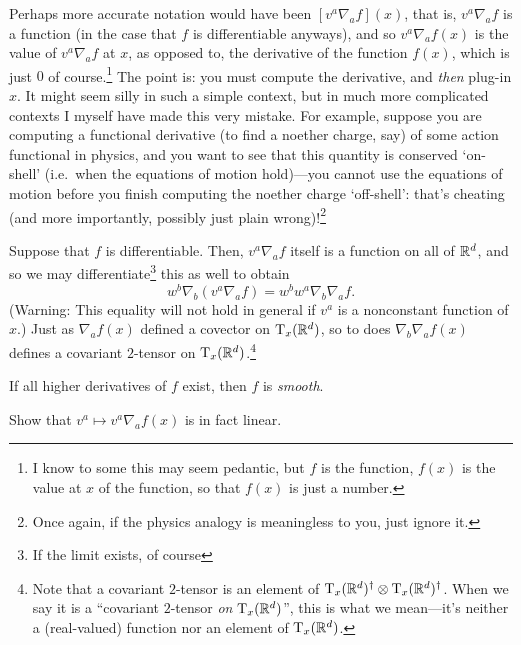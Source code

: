 \begin{dfn}
\begin{savenotes}
\begin{rmk}
\end{rmk}
\begin{rmk}
Perhaps more accurate notation would have been $[v^a\nabla _af](x)$, that is, $v^a\nabla _af$ is a function (in the case that $f$ is differentiable anyways), and so $v^a\nabla _af(x)$ is the value of $v^a\nabla _af$ at $x$, as opposed to, the derivative of the function $f(x)$, which is just $0$ of course.\footnote{I know to some this may seem pedantic, but $f$ is the function, $f(x)$ is the value at $x$ of the function, so that $f(x)$ is just a number.}  The point is:  you must compute the derivative, and \emph{then} plug-in $x$.  It might seem silly in such a simple context, but in much more complicated contexts I myself have made this very mistake.  For example, suppose you are computing a functional derivative (to find a noether charge, say) of some action functional in physics, and you want to see that this quantity is conserved `on-shell' (i.e.~when the equations of motion hold)---you cannot use the equations of motion before you finish computing the noether charge `off-shell':  that's cheating (and more importantly, possibly just plain wrong)!\footnote{Once again, if the physics analogy is meaningless to you, just ignore it.}
\end{rmk}
\begin{rmk}
Suppose that $f$ is differentiable.  Then, $v^a\nabla _af$ itself is a function on all of $\mathbb{R} ^d$, and so we may differentiate\footnote{If the limit exists, of course} this as well to obtain
\begin{equation}
w^b\nabla _b(v^a\nabla _af)=w^bw^a\nabla _b\nabla _af.
\end{equation}
(Warning:  This equality will not hold in general if $v^a$ is a nonconstant function of $x$.)  Just as $\nabla _af(x)$ defined a covector on $\tangent[\R ^d][x]$, so to does $\nabla _b\nabla _af(x)$ defines a covariant $2$-tensor on $\tangent[\R ^d][x]$.\footnote{Note that a covariant $2$-tensor is an element of $\tangent[\R ^d][x]^\dagger \otimes \tangent[\R ^d][x]^\dagger$.  When we say it is a ``covariant $2$-tensor \emph{on} $\tangent[\R ^d][x]$'', this is what we mean---it's neither a (real-valued) function nor an element of $\tangent[\R ^d][x]$.}
\end{rmk}
\begin{rmk}
If all higher derivatives of $f$ exist, then $f$ is \emph{smooth}.
\end{rmk}
\begin{exr}
Show that $v^a\mapsto v^a\nabla _af(x)$ is in fact linear.
\end{exr}
\end{savenotes}
\end{dfn}
